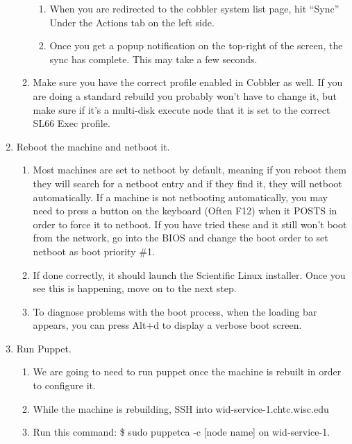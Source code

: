 \documentclass[10pt,letterpaper]{article}
\begin{document}
\begin{enumerate}
\begin{enumerate}
\begin{enumerate}
                \item When you are redirected to the cobbler system list page,
                hit “Sync” Under the Actions tab on the left side.
                \item Once you get a popup notification on the top-right of the
                screen, the sync has complete. This may take a few seconds.
            \end{enumerate}
            \item Make sure you have the correct profile enabled in Cobbler as
            well. If you are doing a standard rebuild you probably won’t have to
            change it, but make sure if it’s a multi-disk execute node that it is
            set to the correct SL66 Exec profile.
        \end{enumerate}
        \item Reboot the machine and netboot it.
        \begin{enumerate}
            \item Most machines are set to netboot by default, meaning if you
            reboot them they will search for a netboot entry and if they find it,
            they will netboot automatically. If a machine is not netbooting automatically,
            you may need to press a button on the keyboard (Often F12) when it POSTS
            in order to force it to netboot. If you have tried these and it still
            won’t boot from the network, go into the BIOS and change the boot order
            to set netboot as boot priority \#1.
            \item If done correctly, it should launch the Scientific Linux installer.
            Once you see this is happening, move on to the next step.
            \item To diagnose problems with the boot process, when the loading bar appears, you can press Alt+d to display a verbose boot screen.
        \end{enumerate}
        \item Run Puppet.
        \begin{enumerate}
            \item We are going to need to run puppet once the machine is rebuilt
            in order to configure it.
            \item While the machine is rebuilding, SSH into wid-service-1.chtc.wisc.edu
            \item Run this command: {\selectfont \$ sudo puppetca
            -c [node name] } on wid-service-1.

\end{enumerate}
\end{enumerate}
\end{document}
